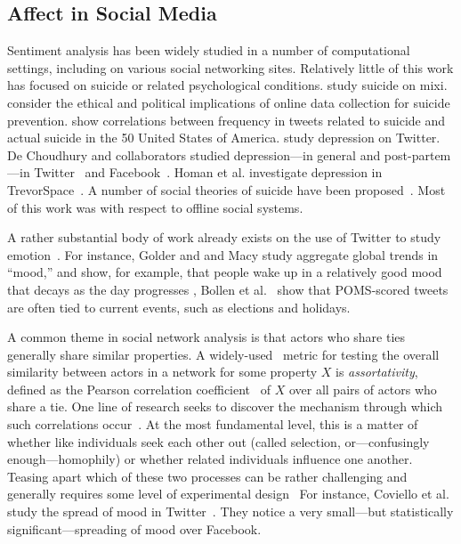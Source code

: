 \documentclass[11pt]{article}
\begin{document}
\subsection{Affect in Social Media}

Sentiment analysis has been widely studied in a number of computational settings, including on various social networking sites. Relatively little of this work has focused on suicide or related psychological conditions. \cite{masuda2013suicide} study suicide on mixi. \cite{cheng2012opportunities} consider the ethical and political implications of online data collection for suicide prevention. \cite{Jay} show correlations between frequency in tweets related to suicide and actual suicide in the 50 United States of America. \cite{sadilek2014modeling} study depression on Twitter. De Choudhury and collaborators studied depression---in general and post-partem---in Twitter~\cite{de2012not,de2012happy,de2013major,de2013understanding} and Facebook~\cite{de2014characterizing}. Homan et al. investigate depression in TrevorSpace~\cite{homan2014social}. A number of social theories of suicide have been proposed~\cite{wray2011sociology}. Most of this work was with respect to offline social systems. 

A rather substantial body of work already exists on the use of Twitter to study emotion~\cite{bollen2011twitter,dodds2011temporal,wang2012harnessing,pfitzner2012emotional,kim2012you,bollen2011happiness,pfitzner2012emotional,bollen2011modeling,mohammad2012emotional,golder2011diurnal,de2012not,de2012happy,de2013major,de2013understanding,hannak2012tweetin,thelwall2011sentiment,pak2010twitter}. For instance,
Golder and and Macy study aggregate global trends in ``mood,'' and show, for example, that people wake up in a relatively good mood that decays as the day progresses \cite{golder2011diurnal}, Bollen et al.~\cite{bollen2011modeling} show that POMS-scored tweets are often tied to current events, such as elections and holidays.

A common theme in social network analysis is that actors who share ties generally share similar properties. A widely-used~\cite{bliss2012twitter,coviello2014,bollen2011happiness} metric for testing the overall similarity between 
actors in a network for some property $X$ is \emph{assortativity}, defined as  the Pearson correlation coefficient~\cite{newman2002assortative} of $X$ over all pairs of actors who share a tie.  One line of research seeks
to discover the mechanism through which such correlations occur~\cite{newman2002assortative}. 
At the most fundamental level, this is a matter of whether like individuals seek each other out (called selection, or---confusingly enough---homophily) or whether related individuals influence one another. Teasing apart which of these two processes can be rather challenging and generally requires some level of experimental design~\cite{centola2010spread,centola2011experimental}
For instance, Coviello et al. study the spread of mood in Twitter~\cite{coviello2014}. They notice a very small---but statistically significant---spreading of mood over Facebook. 
\end{document}
